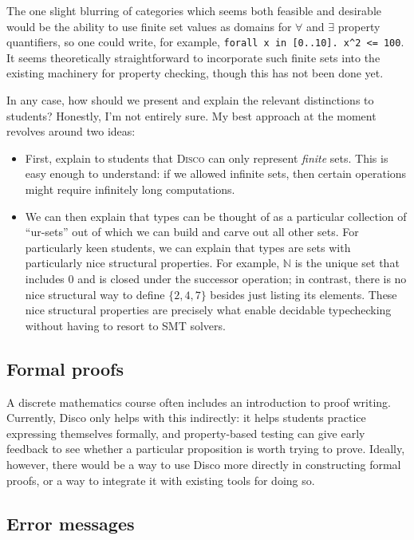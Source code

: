 \documentclass[copyright,creativecommons,12pt]{eptcs}
\newcommand{\disco}{\textsc{Disco}\xspace}
\newcommand{\N}{\mathbb{N}}
\begin{document}
The one slight blurring of categories which seems both feasible and
desirable would be the ability to use finite set values as domains for
$\forall$ and $\exists$ property quantifiers, so one could write, for
example, \texttt{forall x in [0..10]. x^2 <= 100}.  It seems
theoretically straightforward to incorporate such finite sets into the
existing machinery for property checking, though this has not been
done yet.

In any case, how should we present and explain the relevant
distinctions to students?  Honestly, I'm not entirely sure.  My best
approach at the moment revolves around two ideas:
\begin{itemize}
\item First, explain to students that \disco can only represent
  \emph{finite} sets.  This is easy enough to understand: if we
  allowed infinite sets, then certain operations might require
  infinitely long computations.
\item We can then explain that types can be thought of as a particular
  collection of ``ur-sets'' out of which we can build and carve out
  all other sets.  For particularly keen students, we can explain that
  types are sets with particularly nice structural properties.  For
  example, $\N$ is the unique set that includes $0$ and is closed
  under the successor operation; in contrast, there is no nice
  structural way to define $\{2,4,7\}$ besides just listing its
  elements.  These nice structural properties are precisely what
  enable decidable typechecking without having to resort to SMT
  solvers.
\end{itemize}

\subsection{Formal proofs}
\label{sec:formal-proof}

A discrete mathematics course often includes an introduction to proof
writing.  Currently, Disco only helps with this indirectly: it helps
students practice expressing themselves formally, and property-based
testing can give early feedback to see whether a particular
proposition is worth trying to prove.  Ideally, however, there would
be a way to use Disco more directly in constructing formal proofs, or
a way to integrate it with existing tools for doing so.

\subsection{Error messages}
\label{sec:errors}
\end{document}

